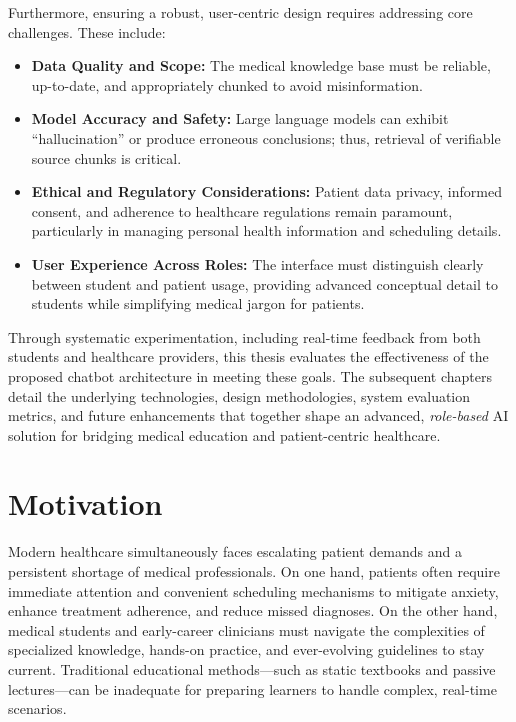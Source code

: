 \noindent Furthermore, ensuring a robust, user-centric design requires addressing core challenges. These include:
\begin{itemize}
    \item \textbf{Data Quality and Scope:} The medical knowledge base must be reliable, up-to-date, and appropriately chunked to avoid misinformation.
    \item \textbf{Model Accuracy and Safety:} Large language models can exhibit “hallucination” or produce erroneous conclusions; thus, retrieval of verifiable source chunks is critical.
    \item \textbf{Ethical and Regulatory Considerations:} Patient data privacy, informed consent, and adherence to healthcare regulations remain paramount, particularly in managing personal health information and scheduling details.
    \item \textbf{User Experience Across Roles:} The interface must distinguish clearly between student and patient usage, providing advanced conceptual detail to students while simplifying medical jargon for patients.
\end{itemize}

\noindent Through systematic experimentation, including real-time feedback from both students and healthcare providers, this thesis evaluates the effectiveness of the proposed chatbot architecture in meeting these goals. The subsequent chapters detail the underlying technologies, design methodologies, system evaluation metrics, and future enhancements that together shape an advanced, \emph{role-based} AI solution for bridging medical education and patient-centric healthcare. 


\section{Motivation}
\label{sec:motivation}

Modern healthcare simultaneously faces escalating patient demands and a persistent shortage of medical professionals. On one hand, patients often require immediate attention and convenient scheduling mechanisms to mitigate anxiety, enhance treatment adherence, and reduce missed diagnoses. On the other hand, medical students and early-career clinicians must navigate the complexities of specialized knowledge, hands-on practice, and ever-evolving guidelines to stay current. Traditional educational methods—such as static textbooks and passive lectures—can be inadequate for preparing learners to handle complex, real-time scenarios.

